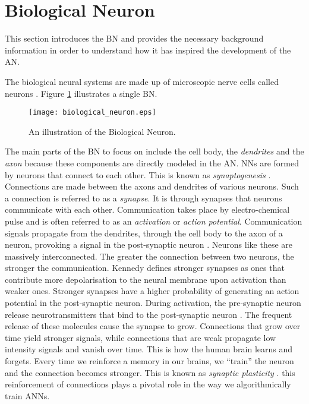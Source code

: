 \section{Biological Neuron}
\label{sec:anns:bn}

This section introduces the \ac{BN} and provides the necessary background
information in order to understand how it has inspired the development
of the \ac{AN}. 

The biological neural systems are made up of microscopic nerve cells called
neurons \cite{ref:jain:1996}. Figure \ref{fig:biological_neuron} illustrates a
single \ac{BN}.

\begin{figure}[htpb]
    \centering
    \texttt{[image: biological\_neuron.eps]}
    \caption[The Biological Neuron]{An illustration of
    the Biological Neuron.}
    \label{fig:biological_neuron}
\end{figure}

The main parts of the \ac{BN} to focus on include the cell body, the
\textit{dendrites} and the \textit{axon} because these
components are directly modeled in the \ac{AN}. \Acp{NN} are formed by
neurons that connect to each other. This is known as
\textit{synaptogenesis} \cite{ref:huttenlocher:1997}.
Connections are made between the axons and
dendrites of various neurons. Such a connection is referred to
as a \textit{synapse}. It is through synapses
that neurons communicate with each other. Communication takes place by
electro-chemical pulse and is often referred to as an \textit{activation} or
\textit{action potential}.  Communication signals propagate from the
dendrites, through the cell body to the axon of a neuron,
provoking a signal in the post-synaptic neuron \cite{ref:engelbrecht:2007}.
Neurons like these are massively interconnected.  The greater the connection
between two neurons, the stronger the communication.  Kennedy
\cite{ref:kennedy:2016} defines stronger synapses as ones that
contribute more depolarisation to the neural membrane upon activation than
weaker ones. Stronger synapses have a higher probability of
generating an action potential in the post-synaptic neuron. During activation,
the pre-synaptic neuron release neurotransmitters that bind to the post-synaptic
neuron \cite{ref:khanacademy:synapse}. The frequent release of these molecules
cause the synapse to grow. Connections that grow over time yield
stronger signals, while connections that are weak propagate low intensity
signals and vanish over time. This is how the human brain learns and forgets.
Every time we reinforce a memory in our brains, we ``train'' the neuron and the
connection becomes stronger. This is known as \textit{synaptic plasticity} \cite{ref:huttenlocher:1997}. this
reinforcement of connections plays a pivotal role in the way we algorithmically
train \acp{ANN}.


